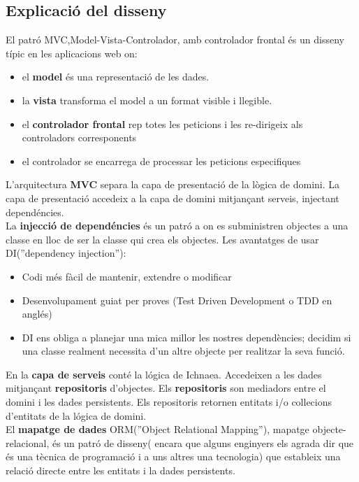 \subsection{Explicaci\'{o} del disseny}
El patró MVC,Model-Vista-Controlador, amb controlador frontal \'{e}s un disseny t\'{i}pic en les aplicacions web on:
\begin{itemize}
\item el \textbf{model} \'{e}s una representaci\'{o} de les dades.
\item la \textbf{vista} transforma el model a un format visible i llegible.
\item el \textbf{controlador frontal} rep totes les peticions i les re-dirigeix als controladors corresponents
\item el controlador se encarrega de processar les peticions especifiques
\end{itemize}
L'arquitectura \textbf{MVC} separa la capa de presentaci\'{o} de la l\`{o}gica de domini. La capa de presentaci\'{o} accedeix a la capa de domini mitjançant serveis, injectant depend\'{e}ncies. \\
La \textbf{injecci\'{o} de depend\'{e}ncies} \'{e}s un patr\'{o} a on es subministren objectes a una classe en lloc de ser la classe qui crea els objectes.\cite{dependency_injection} Les avantatges de usar DI(''dependency injection''):
\begin{itemize}
\item Codi m\'{e}s f\`{a}cil de mantenir, extendre o modificar
\item Desenvolupament guiat per proves (Test Driven Development o TDD en angl\'{e}s)
\item DI ens obliga a planejar una mica millor les nostres depend\`{e}ncies; decidim si una classe realment necessita d'un altre objecte per realitzar la seva funció.
\end{itemize}

En la \textbf{capa de serveis} cont\'{e} la l\'{o}gica de Ichnaea. Accedeixen a les dades mitjançant \textbf{repositoris} d'objectes. Els \textbf{repositoris} son mediadors entre el domini i les dades persistents. Els repositoris retornen entitats i/o collecions d'entitats de la l\'{ogica} de domini. \\

El \textbf{mapatge de dades} ORM(''Object Relational Mapping''), mapatge objecte-relacional, \'{e}s un patr\'{o} de disseny( encara que alguns enginyers els agrada dir que \'{e}s una tècnica de programaci\'{o} i a uns altres una tecnologia) que estableix una relaci\'{o} directe entre les entitats i la dades persistents.\cite{orm}

